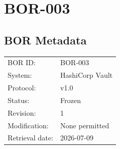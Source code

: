 \documentclass{article}
\begin{document}
\newpage
\section*{BOR-003}

\subsection*{BOR Metadata}
\begin{tabular}{@{}ll@{}}
\toprule
BOR ID: & BOR-003\\
System: & HashiCorp Vault\\
Protocol: & v1.0\\
Status: & Frozen\\
Revision: & 1\\
Modification: & None permitted\\
Retrieval date: & 2026-07-09\\
\bottomrule
\end{tabular}
\end{document}

